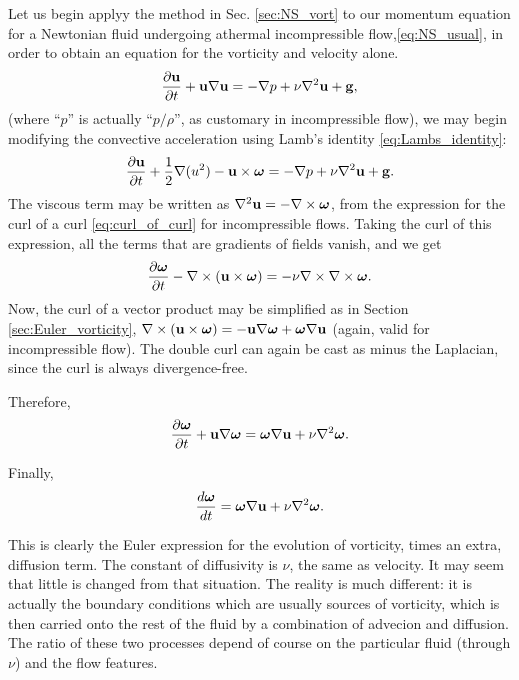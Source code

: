 Let us begin applyy the method in Sec. \ref{sec:NS_vort} to our
momentum equation for a Newtonian fluid undergoing athermal
incompressible flow,\ref{eq:NS_usual}, in order to obtain an equation
for the vorticity and velocity alone.
\begin{equation*}
  \frac{\partial \mathbf{u} }{\partial t}
  + \mathbf{u} \nabla \mathbf{u}
  =
  - \nabla p 
  + \nu \nabla^2 \mathbf{u}
  + \mathbf{g} ,
\end{equation*}
(where ``$p$'' is actually ``$p/\rho$'', as customary in
incompressible flow), we may begin modifying the convective
acceleration using Lamb's identity \ref{eq:Lambs_identity}:
\begin{equation*}
  \frac{\partial \mathbf{u} }{\partial t}
  + \frac12 \nabla (u^2)
  -\mathbf{u}\times\bm{\omega}
  =
  - \nabla p 
  + \nu \nabla^2 \mathbf{u}
  + \mathbf{g} .
\end{equation*}
The viscous term may be written as
$\nabla^2 \mathbf{u} = -\nabla\times\bm{\omega}$, from the expression for the curl
of a curl \ref{eq:curl_of_curl} for incompressible flows. Taking the
curl of this expression, all the terms that are gradients of fields
vanish, and we get
\begin{equation*}
  \frac{\partial \bm{\omega} }{\partial t}
  -\nabla\times (\mathbf{u} \times \bm{\omega} )
  =
  -\nu  \nabla\times\nabla\times\bm{\omega} .
\end{equation*}
Now, the curl of a vector product may be simplified as in Section
\ref{sec:Euler_vorticity}, $\nabla\times (\mathbf{u} \times \bm{\omega} ) =
-\mathbf{u}\nabla\bm{\omega} + \bm{\omega}\nabla\mathbf{u}$ (again, valid for incompressible
flow). The double curl can again be cast as minus the Laplacian, since
the curl is always divergence-free.

Therefore,
\begin{equation*}
  \frac{\partial \bm{\omega} }{\partial t} +
  \mathbf{u}\nabla\bm{\omega} 
  =
  \bm{\omega}\nabla\mathbf{u}
  +\nu  \nabla^2\bm{\omega} .
\end{equation*}

Finally,
\begin{equation*}
  \frac{d \bm{\omega} }{d t}
  =
  \bm{\omega}\nabla\mathbf{u}
  +\nu  \nabla^2\bm{\omega} .
\end{equation*}

This is clearly the Euler expression for the evolution of vorticity,
times an extra, diffusion term. The constant of diffusivity is $\nu$,
the same as velocity. It may seem that little is changed from that
situation. The reality is much different: it is actually the boundary
conditions which are usually sources of vorticity, which is then
carried onto the rest of the fluid by a combination of advecion and
diffusion. The ratio of these two processes depend of course on the
particular fluid (through $\nu$) and the flow features.
